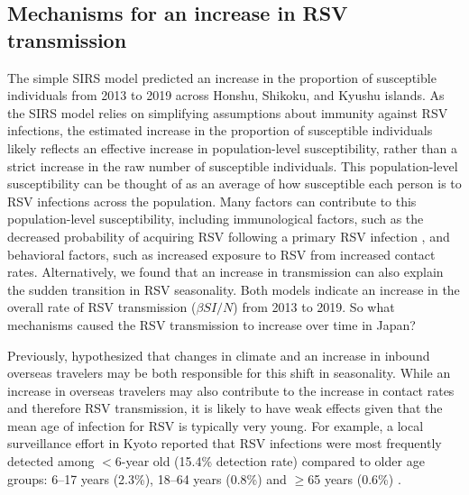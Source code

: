 \documentclass[12pt]{article}
\begin{document}
\subsection*{Mechanisms for an increase in RSV transmission}

The simple SIRS model predicted an increase in the proportion of susceptible individuals from 2013 to 2019 across Honshu, Shikoku, and Kyushu islands.
As the SIRS model relies on simplifying assumptions about immunity against RSV infections, the estimated increase in the proportion of susceptible individuals likely reflects an effective increase in population-level susceptibility, rather than a strict increase in the raw number of susceptible individuals.
This population-level susceptibility can be thought of as an average of how susceptible each person is to RSV infections across the population.
Many factors can contribute to this population-level susceptibility, including immunological factors, such as the decreased probability of acquiring RSV following a primary RSV infection \citep{pitzer2015environmental}, and behavioral factors, such as increased exposure to RSV from increased contact rates.
Alternatively, we found that an increase in transmission can also explain the sudden transition in RSV seasonality.
Both models indicate an increase in the overall rate of RSV transmission ($\beta S I/N$) from 2013 to 2019.
So what mechanisms caused the RSV transmission to increase over time in Japan?

Previously, \cite{wagatsuma2021shifts} hypothesized that changes in climate and an increase in inbound overseas travelers may be both responsible for this shift in seasonality.
While an increase in overseas travelers may also contribute to the increase in contact rates and therefore RSV transmission, it is likely to have weak effects given that the mean age of infection for RSV is typically very young.
For example, a local surveillance effort in Kyoto reported that RSV infections were most frequently detected among $<6$-year old (15.4\% detection rate) compared to older age groups: 6--17 years (2.3\%), 18–64 years (0.8\%) and $\geq$65 years (0.6\%) \citep{matsumura2025epidemiology}.
\end{document}
